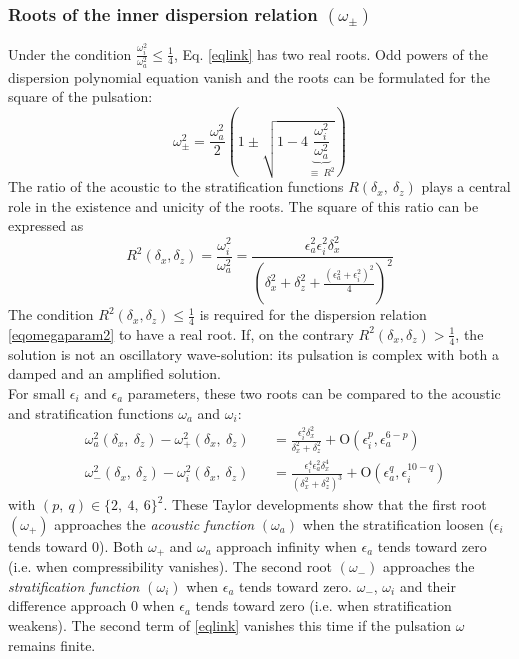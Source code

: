 \documentclass[a4paper,11pt]{article}
\begin{document}
\subsubsection{Roots of the inner dispersion relation $(\omega_\pm)$}
Under the condition $\displaystyle \frac{\omega_i^2}{\omega_a^2}\le \frac{1}{4}$, Eq. \ref{eqlink} has two real roots. Odd powers of the dispersion polynomial equation vanish and the roots can be formulated for the square of the pulsation:
\begin{equation}
	\omega_{\pm}^2
	=\frac{\omega_a^2}{2}
	\left(
	1\pm
	\sqrt{1-4\underbrace{\frac{\omega_i^2}{\omega_a^2}}_{\equiv\ R^2}}
	\right)
\label{solseq}
\end{equation}
The ratio of the acoustic to the stratification functions $R(\delta_x,\ \delta_z)$ plays a central role in the existence and unicity of the roots. The square of this ratio can be expressed as
\begin{equation}
	R^2(\delta_x,\delta_z)=
	\frac{\omega_i^2}{\omega_a^2}=
	\frac{\epsilon_a^2\epsilon_i^2\delta_x^2}
	{\left(\delta_x^2+\delta_z^2
	+\frac{(\epsilon_a^2+\epsilon_i^2)^2}{4}
	\right)^2}
\label{eqratio}
\end{equation}
The condition $\displaystyle R^2(\delta_x,\delta_z)\le \frac{1}{4}$ is required for the dispersion relation \ref{eqomegaparam2} to have a real root. If, on the contrary $\displaystyle R^2(\delta_x,\delta_z) >\frac{1}{4}$, the solution is not an oscillatory wave-solution: its pulsation is complex with both a damped and an amplified solution.\\
For small $\epsilon_i$ and $\epsilon_a$ parameters, these two roots can be compared to the acoustic and stratification functions $\omega_a$ and $\omega_i$:
\begin{subequations}
	\begin{alignat}{2}
	\label{Comp1}
	&\omega_a^2(\delta_x,\ \delta_z)-\omega_{+}^2(\delta_x,\ \delta_z)
	&&=\frac{\epsilon_i^2\delta_x^2}{\delta_x^2+\delta_z^2}
	+\mathrm{O}	(\epsilon_i^p,\epsilon_a^{6-p})\\[3mm]
	\label{Comp2}
	&\omega_{-}^2(\delta_x,\ \delta_z)-\omega_i^2(\delta_x,\ \delta_z)
	&&=\frac{\epsilon_i^4\epsilon_a^2\delta_x^4}{(\delta_x^2+\delta_z^2)^3}
	+\mathrm{O}	(\epsilon_a^q,\epsilon_i^{10-q})
	\end{alignat}	
\end{subequations}
with $(p,\ q)\in\{2,\ 4,\ 6\}^2$. These Taylor developments show that the first root $(\omega_+)$ approaches the \textit{acoustic function} $(\omega_a)$ when the stratification loosen ($\epsilon_i$ tends toward 0). Both $\omega_+$  and $\omega_a$ approach infinity when $\epsilon_a$ tends toward zero (i.e. when compressibility vanishes). The second root $(\omega_-)$ approaches the \textit{stratification function} $(\omega_i)$ when $\epsilon_a$ tends toward zero. $\omega_-$, $\omega_i$ and their difference approach 0 when $\epsilon_a$ tends toward zero (i.e. when stratification weakens). The second term of \ref{eqlink} vanishes this time if the pulsation $\omega$ remains finite.\\
\end{document}

